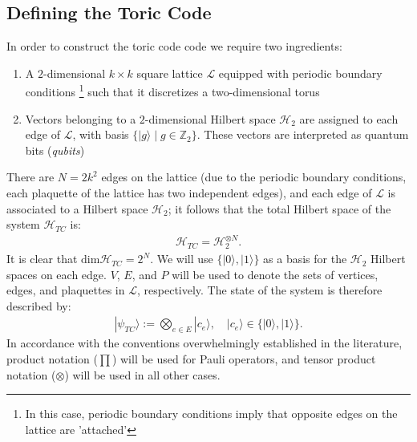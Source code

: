 \documentclass[12pt]{article}
\theoremstyle{definition}
\begin{document}
\subsection{Defining the Toric Code}
In order to construct the toric code code we require two ingredients:
    \begin{enumerate}
        \item A $2$-dimensional $k\times k$ square lattice $\mathcal{L}$ equipped with periodic boundary conditions \footnote{In this case, periodic boundary conditions imply that opposite edges on the lattice are 'attached'} such that it discretizes a two-dimensional torus
        \item Vectors belonging to a $2$-dimensional Hilbert space $\mathcal{H}_2$ are assigned to each edge of $\mathcal{L}$, with basis $\{|g\rangle\mid g\in \mathbb{Z}_2\}$. These vectors are interpreted as quantum bits (\emph{qubits})
    \end{enumerate}
There are $N = 2k^2$ edges on the lattice (due to the periodic boundary conditions, each plaquette of the lattice has two independent edges), and each edge of $\mathcal{L}$ is associated to a Hilbert space $\mathcal{H}_2$; it follows that the total Hilbert space of the system $\mathcal{H}_{TC}$ is:
    \begin{align}
        \mathcal{H}_{TC} = \mathcal{H}^{\otimes N}_2.
    \end{align}
It is clear that $\text{dim}\mathcal{H}_{TC} = 2^{N}$. We will use $\{|0\rangle,|1\rangle\}$ as a basis for the $\mathcal{H}_2$ Hilbert spaces on each edge. $V$, $E$, and $P$ will be used to denote the sets of vertices, edges, and plaquettes in $\mathcal{L}$, respectively. The state of the system is therefore described by:
    \begin{align}
        |\psi_{TC}\rangle :=\bigotimes_{e\in E}|c_e\rangle,\enspace\enspace |c_e\rangle\in \{|0\rangle,|1\rangle\}.
    \end{align}
In accordance with the conventions overwhelmingly established in the literature, product notation ($\prod$) will be used for Pauli operators, and tensor product notation ($\otimes$) will be used in all other cases.\newpage
\end{document}
